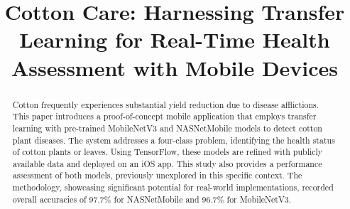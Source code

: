 \documentclass[conference]{IEEEtran}
\begin{document}
\title{Cotton Care: Harnessing Transfer Learning for Real-Time Health Assessment with Mobile Devices\\}

\makeatletter
\newcommand{\linebreakand}{%
  \end{@IEEEauthorhalign}
  \hfill\mbox{}\par
  \mbox{}\hfill\begin{@IEEEauthorhalign}
}
\makeatother

\author{
\and
{}
\and
{}
}



\maketitle

\begin{abstract}
Cotton frequently experiences substantial yield reduction due to disease afflictions. This paper introduces a proof-of-concept mobile application that employs transfer learning with pre-trained MobileNetV3 and NASNetMobile models to detect cotton plant diseases. The system addresses a four-class problem, identifying the health status of cotton plants or leaves. Using TensorFlow, these models are refined with publicly available data and deployed on an iOS app. This study also provides a performance assessment of both models, previously unexplored in this specific context. The methodology, showcasing significant potential for real-world implementations, recorded overall accuracies of 97.7\% for NASNetMobile and 96.7\% for MobileNetV3.
\end{abstract}
\end{document}
